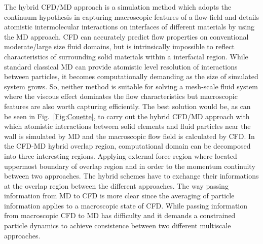 \documentclass{CFD2010paper}
\begin{document}
The hybrid CFD/MD approach is a simulation method which adopts the continuum hypothesis in capturing macroscopic features of a flow-field and details atomistic
intermolecular interactions on interfaces of different materials by using the MD approach. CFD can accurately predict flow properties on conventional moderate/large size fluid domains, but is intrinsically
impossible to reflect characteristics of surrounding solid materials within a interfacial region. While standard classical MD can provide atomistic level resolution of interactions between particles, it becomes computationally demanding as the size of simulated system grows. So, neither method is suitable for solving a mesh-scale fluid system where the viscous effect dominates the flow characteristics but macroscopic features are also worth capturing efficiently. The best solution would be, as can be seen in Fig.~\ref{Fig:Couette}, to carry out the hybrid CFD/MD approach with which atomistic interactions between solid elements and fluid particles near the wall is simulated by MD and the macroscopic flow field is calculated by CFD.
In the CFD-MD hybrid overlap region, computational domain can be decomposed into three interesting regions. Applying external force region where located uppermost boundary of overlap region and in order to the momentum continuity between two approaches. The hybrid schemes have to exchange their informations at the overlap region between the different approaches. The way passing information from MD to CFD is more clear since the averaging of particle information applies to a macroscopic state of CFD. While passing information from macroscopic CFD to MD has difficulty and it demands a constrained particle dynamics to achieve consistence between two different  multiscale approaches.
\end{document}
